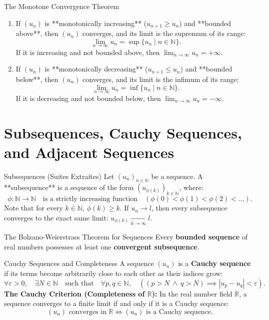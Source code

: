 \begin{theorembox}{The Monotone Convergence Theorem}
\begin{enumerate}[leftmargin=1.4em,itemsep=3pt]
  \item If $(u_n)$ is **monotonically increasing** ($u_{n+1} \ge u_n$) and **bounded above**, then $(u_n)$ converges, and its limit is the supremum of its range:
  \[
  \lim_{n \to \infty} u_n = \sup \{ u_n \mid n \in \mathbb{N} \}.
  \]
  If it is increasing and not bounded above, then $\lim_{n \to \infty} u_n = +\infty$.
  \item If $(u_n)$ is **monotonically decreasing** ($u_{n+1} \le u_n$) and **bounded below**, then $(u_n)$ converges, and its limit is the infimum of its range:
  \[
  \lim_{n \to \infty} u_n = \inf \{ u_n \mid n \in \mathbb{N} \}.
  \]
  If it is decreasing and not bounded below, then $\lim_{n \to \infty} u_n = -\infty$.
\end{enumerate}
\end{theorembox}

\section{Subsequences, Cauchy Sequences, and Adjacent Sequences}

\begin{definitionbox}{Subsequences (Suites Extraites)}
Let $(u_n)_{n \in \mathbb{N}}$ be a sequence. A **subsequence** is a sequence of the form $(u_{\phi(k)})_{k \in \mathbb{N}}$, where:
\[
\phi: \mathbb{N} \longrightarrow \mathbb{N} \quad \text{is a strictly increasing function} \quad (\phi(0) < \phi(1) < \phi(2) < \dots).
\]
Note that for every $k \in \mathbb{N}$, $\phi(k) \ge k$.
If $u_n \to l$, then every subsequence converges to the exact same limit: $u_{\phi(k)} \xrightarrow[k \to \infty]{} l$.
\end{definitionbox}

\begin{theorembox}{The Bolzano-Weierstrass Theorem for Sequences}
Every \textbf{bounded sequence} of real numbers possesses at least one \textbf{convergent subsequence}.
\end{theorembox}

\begin{definitionbox}{Cauchy Sequences and Completeness}
A sequence $(u_n)$ is a \textbf{Cauchy sequence} if its terms become arbitrarily close to each other as their indices grow:
\begin{equation}
\forall \varepsilon > 0, \quad \exists N \in \mathbb{N} \quad \text{such that} \quad \forall p, q \in \mathbb{N}, \quad \left( (p > N \ \land \ q > N) \implies |u_p - u_q| < \varepsilon \right).
\end{equation}
\textbf{The Cauchy Criterion (Completeness of $\mathbb{R}$):}
In the real number field $\mathbb{R}$, a sequence converges to a finite limit if and only if it is a Cauchy sequence:
\[
(u_n) \text{ converges in } \mathbb{R} \iff (u_n) \text{ is a Cauchy sequence}.
\]
\end{definitionbox}

